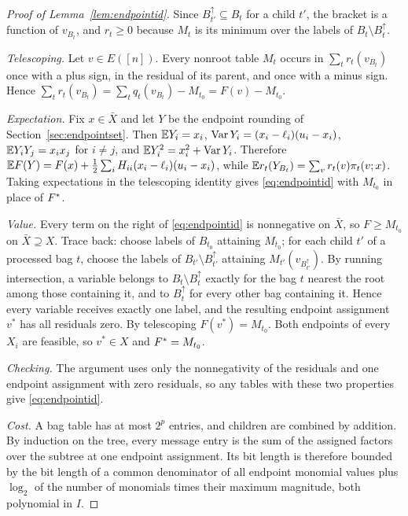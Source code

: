 \begin{proof}[Proof of Lemma~\ref{lem:endpointid}]
Since $B_{t'}^{\uparrow}\subseteq B_t$ for a child $t'$, the bracket is a
function of $v_{B_t}$, and $r_t\ge0$ because $M_t$ is its minimum over the
labels of $B_t\setminus B_t^\uparrow$.

\emph{Telescoping.} Let $v\in E([n])$. Every nonroot table $M_t$ occurs in
$\sum_tr_t(v_{B_t})$ once with a plus sign, in the residual of its parent, and
once with a minus sign. Hence $\sum_tr_t(v_{B_t})=\sum_tq_t(v_{B_t})-M_{t_0}
=F(v)-M_{t_0}$.

\emph{Expectation.} Fix $x\in\bar X$ and let $Y$ be the endpoint rounding
of Section~\ref{sec:endpointset}. Then $\mathbb E Y_i=x_i$,
$\operatorname{Var} Y_i=(x_i-\ell_i)(u_i-x_i)$, $\mathbb E Y_iY_j=x_ix_j$ for $i\ne j$,
and $\mathbb E Y_i^2=x_i^2+\operatorname{Var} Y_i$. Therefore
$\mathbb E F(Y)=F(x)+\frac12\sum_iH_{ii}(x_i-\ell_i)(u_i-x_i)$, while
$\mathbb E r_t(Y_{B_t})=\sum_vr_t(v)\pi_t(v;x)$. Taking expectations in the
telescoping identity gives \eqref{eq:endpointid} with $M_{t_0}$ in place
of $F^{*}$.

\emph{Value.} Every term on the right of \eqref{eq:endpointid} is
nonnegative on $\bar X$, so $F\ge M_{t_0}$ on $\bar X\supseteq X$. Trace back:
choose labels of $B_{t_0}$ attaining $M_{t_0}$; for each child $t'$ of a
processed bag $t$, choose the labels of $B_{t'}\setminus B_{t'}^\uparrow$
attaining $M_{t'}(v_{B_{t'}^\uparrow})$. By running intersection, a variable
belongs to $B_t\setminus B_t^\uparrow$ exactly for the bag $t$ nearest the
root among those containing it, and to $B_{t}^{\uparrow}$ for every other bag
containing it. Hence every variable receives exactly one label, and the
resulting endpoint assignment $v^*$ has all residuals zero. By telescoping
$F(v^*)=M_{t_0}$. Both endpoints of every $X_i$ are feasible, so $v^*\in X$
and $F^{*}=M_{t_0}$.

\emph{Checking.} The argument uses only the nonnegativity of the residuals
and one endpoint assignment with zero residuals, so any tables with these two
properties give \eqref{eq:endpointid}.

\emph{Cost.} A bag table has at most $2^p$ entries, and children are combined
by addition. By induction on the tree, every message entry is the sum of the
assigned factors over the subtree at one endpoint assignment. Its bit length
is therefore bounded by the bit length of a common denominator of all endpoint
monomial values plus $\log_2$ of the number of monomials times their maximum
magnitude, both polynomial in $I$.
\end{proof}

